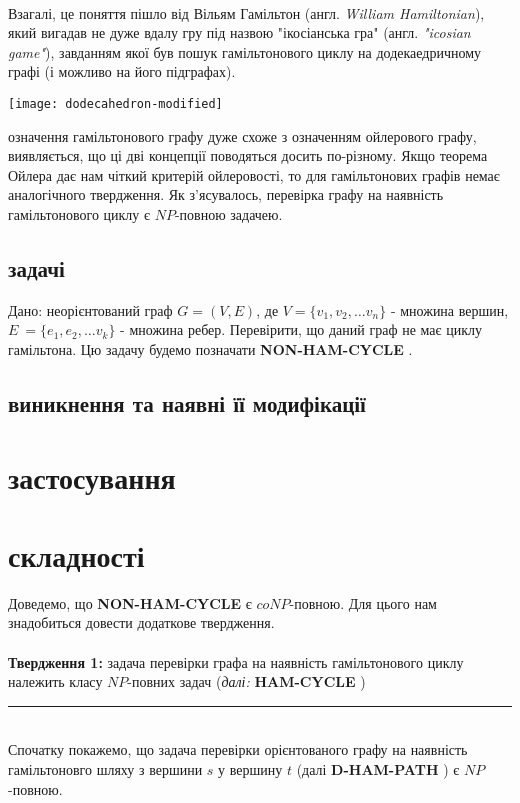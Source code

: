 \documentclass[14pt]{article}
\begin{document}
\begin{spacing}{1.175}
        \\
        \quad Взагалі, це поняття пішло від Вільям Гамільтон (англ. \textit{William Hamiltonian}), який вигадав не дуже вдалу гру під назвою "ікосіанська гра" (англ. \textit{"icosian game"}), завданням якої був пошук гамільтонового циклу на додекаедричному графі (і можливо на його підграфах). \\
        \begin{center}
        \texttt{[image: dodecahedron-modified]} \\
        \end{center}
        
         означення гамільтонового графу дуже схоже з означенням ойлерового графу, виявляється, що ці дві концепції поводяться досить по-різному. Якщо теорема Ойлера дає нам чіткий критерій ойлеровості, то для гамільтонових графів немає аналогічного твердження. Як з'ясувалось, перевірка графу на наявність гамільтонового циклу є \(NP\)-повною задачею.

        \newcommand{\nonhamcycle}{\textbf{NON-HAM-CYCLE }}
        \newcommand{\hamcycle}{\textbf{HAM-CYCLE }}
        \newcommand{\dhampath}{\textbf{D-HAM-PATH }}
        \newcommand{\tsat}{\textbf{3SAT }}
        \subsection{ задачі}
        \quad Дано: неорієнтований граф \(G = (V,E)\), де \(V = \{v_1, v_2, \dots v_n\}\) - множина вершин, \(E\ = \{e_1, e_2, \dots v_k\}\) - множина ребер. Перевірити, що даний граф не має циклу гамільтона. Цю задачу будемо позначати \nonhamcycle .    
        \subsection{ виникнення та наявні її модифікації}
    
    \section{ застосування}
    
    \section{ складності}
    \quad Доведемо, що \nonhamcycle є \(coNP\)-повною. Для цього нам знадобиться довести додаткове твердження. \\\\
    \textbf{Твердження 1:} задача перевірки графа на наявність гамільтонового циклу належить класу \(NP\)-повних задач (\textit{далі:} \hamcycle)\\
    \rule{0.7em}{0.7em}\\
    Спочатку покажемо, що задача перевірки орієнтованого графу на наявність гамільтоновго шляху з вершини \(s\) у вершину \(t\) (далі \dhampath)  є \(NP\)-повною.
    \\ 
    

\end{spacing}
\end{document}
